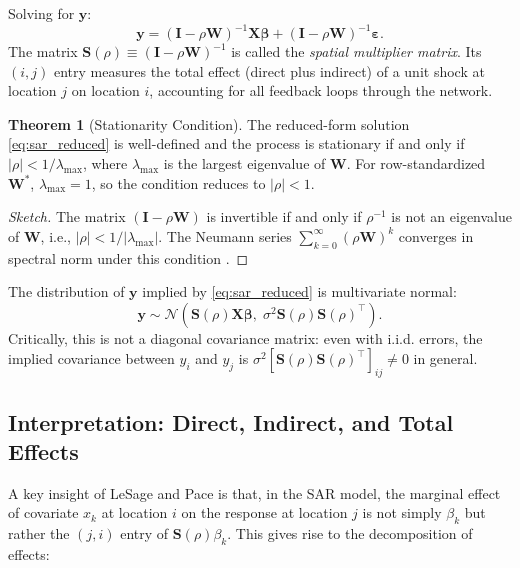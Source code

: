 \documentclass[conference]{IEEEtran}
\theoremstyle{definition}
\newtheorem{theorem}{Theorem}
\begin{document}
Solving for $\mathbf{y}$:
\begin{equation}
\mathbf{y} = (\mathbf{I} - \rho \mathbf{W})^{-1} \mathbf{X}\bm{\beta} + (\mathbf{I} - \rho \mathbf{W})^{-1} \bm{\varepsilon}.
\label{eq:sar_reduced}
\end{equation}
The matrix $\mathbf{S}(\rho) \equiv (\mathbf{I} - \rho \mathbf{W})^{-1}$ is called the \emph{spatial multiplier matrix}. Its $(i,j)$ entry measures the total effect (direct plus indirect) of a unit shock at location $j$ on location $i$, accounting for all feedback loops through the network.

\begin{theorem}[Stationarity Condition]
The reduced-form solution \eqref{eq:sar_reduced} is well-defined and the process is stationary if and only if $|\rho| < 1/\lambda_{\max}$, where $\lambda_{\max}$ is the largest eigenvalue of $\mathbf{W}$. For row-standardized $\mathbf{W}^*$, $\lambda_{\max} = 1$, so the condition reduces to $|\rho| < 1$.
\end{theorem}

\begin{proof}[Sketch]
The matrix $(\mathbf{I} - \rho\mathbf{W})$ is invertible if and only if $\rho^{-1}$ is not an eigenvalue of $\mathbf{W}$, i.e., $|\rho| < 1/|\lambda_{\max}|$. The Neumann series $\sum_{k=0}^{\infty} (\rho\mathbf{W})^k$ converges in spectral norm under this condition \cite{lesage2009introduction}.
\end{proof}

The distribution of $\mathbf{y}$ implied by \eqref{eq:sar_reduced} is multivariate normal:
\begin{equation}
\mathbf{y} \sim \mathcal{N}\!\left(\mathbf{S}(\rho)\mathbf{X}\bm{\beta},\; \sigma^2 \mathbf{S}(\rho)\mathbf{S}(\rho)^\top\right).
\end{equation}
Critically, this is not a diagonal covariance matrix: even with i.i.d. errors, the implied covariance between $y_i$ and $y_j$ is $\sigma^2 [\mathbf{S}(\rho)\mathbf{S}(\rho)^\top]_{ij} \neq 0$ in general.

\subsection{Interpretation: Direct, Indirect, and Total Effects}

A key insight of LeSage and Pace \cite{lesage2009introduction} is that, in the SAR model, the marginal effect of covariate $x_k$ at location $i$ on the response at location $j$ is not simply $\beta_k$ but rather the $(j,i)$ entry of $\mathbf{S}(\rho)\beta_k$. This gives rise to the decomposition of effects:
\end{document}
